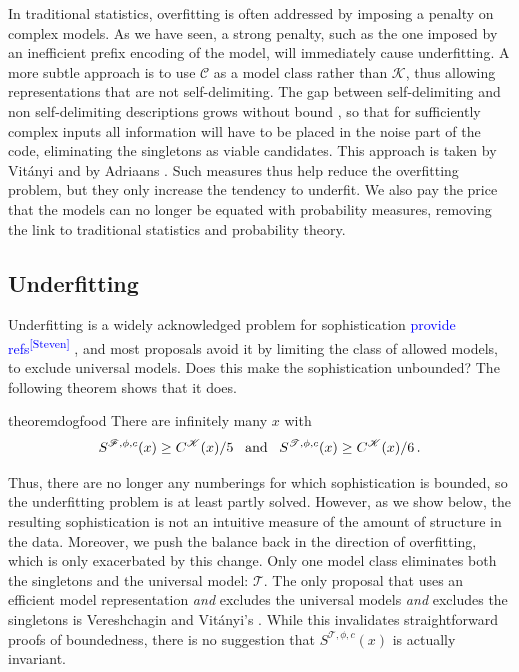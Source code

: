 \documentclass{style/llncs}
\newcommand{\C}{\mathscr C}
\newcommand{\T}{\mathscr T}
\newcommand{\F}{\mathscr F}
\newcommand{\K}{\mathscr K}
\newcommand{\s}{S}
\newcommand{\p}{\,\text{.}}
\newcommand{\sdr}[1]{\textcolor{blue}{\small #1\textsuperscript{[Steven]} }}
\begin{document}
In traditional statistics, overfitting is often addressed by imposing a penalty on complex models. As we have seen, a strong penalty, such as the one imposed by an inefficient prefix encoding of the model, will immediately cause underfitting. A more subtle approach is to use $\C$ as a model class rather than $\K$, thus allowing representations that are not self-delimiting. The gap between self-delimiting and non self-delimiting descriptions grows without bound 
\cite[Section~4.5.5]{vitanyi2004meaningful}, so that for sufficiently complex inputs all information will have to be placed in the noise part of the code, eliminating the singletons as viable candidates. This approach is taken by Vit\'anyi \cite{vitanyi2004meaningful} and by Adriaans \cite{adriaans2012facticity}. Such measures thus help reduce the overfitting problem, but they only increase the tendency to underfit. We also pay the price that the models can no longer be equated with probability measures, removing the link to traditional statistics and probability theory.

\subsection{Underfitting}

Underfitting is a widely acknowledged problem for sophistication \sdr{provide refs}, and most proposals avoid it by limiting the class of allowed models, to exclude universal models. Does this make the sophistication unbounded? The following theorem shows that it does.

\begin{restatable}{theorem}{dogfood}
There are infinitely many $x$ with 
\[
	\s^{\F,\phi,c}(x) \geq C^{\K}(x)/5  \text{\;\;\;and\;\;\;} \s^{\T,\phi,c}(x) \geq C^{\K}(x)/6\p
\] 
\end{restatable} 

Thus, there are no longer any numberings for which sophistication is bounded, so the underfitting problem is at least partly solved. However, as we show below, the resulting sophistication is not an intuitive measure of the amount of structure in the data. Moreover, we push the balance back in the direction of overfitting, which is only exacerbated by this change. Only one model class eliminates both the singletons and the universal model: $\T$. The only proposal that uses an efficient model representation \emph{and} excludes the universal models \emph{and} excludes the singletons is Vereshchagin and Vit\'anyi's \cite{vitanyi2004meaningful}. While this invalidates straightforward proofs of boundedness, there is no suggestion that $S^{\T, \phi, c}(x)$ is actually invariant.
\end{document}

